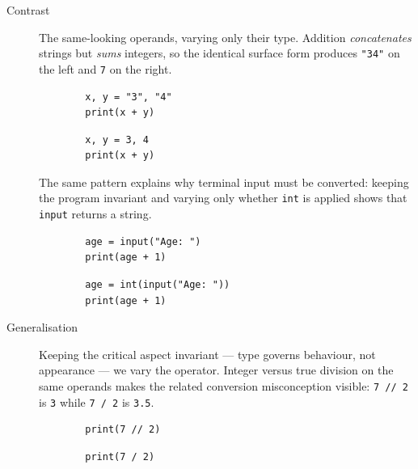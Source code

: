 \begin{description}
  \item[Contrast] The same-looking operands, varying only their type. Addition
    \emph{concatenates} strings but \emph{sums} integers, so the identical
    surface form produces \texttt{"34"} on the left and
    \texttt{7} on the right.

    \hfill
    \begin{minipage}[t]{0.45\columnwidth}
      \begin{verbatim}
        x, y = "3", "4"
        print(x + y)
      \end{verbatim}
    \end{minipage}
    \hfill
    \begin{minipage}[t]{0.45\columnwidth}
      \begin{verbatim}
        x, y = 3, 4
        print(x + y)
      \end{verbatim}
    \end{minipage}
    \newline
    The same pattern explains why terminal input must be converted: keeping the
    program invariant and varying only whether \texttt{int} is
    applied shows that \texttt{input} returns a string.

    \hfill
    \begin{minipage}[t]{0.45\columnwidth}
      \begin{verbatim}
        age = input("Age: ")
        print(age + 1)
      \end{verbatim}
    \end{minipage}
    \hfill
    \begin{minipage}[t]{0.45\columnwidth}
      \begin{verbatim}
        age = int(input("Age: "))
        print(age + 1)
      \end{verbatim}
    \end{minipage}

  \item[Generalisation] Keeping the critical aspect invariant --- type governs
    behaviour, not appearance --- we vary the operator. Integer versus
    true division on the same operands makes the related conversion
    misconception visible: \texttt{7 // 2} is
    \texttt{3} while \texttt{7 / 2} is
    \texttt{3.5}.

    \hfill
    \begin{minipage}[t]{0.45\columnwidth}
      \begin{verbatim}
        print(7 // 2)
      \end{verbatim}
    \end{minipage}
    \hfill
    \begin{minipage}[t]{0.45\columnwidth}
      \begin{verbatim}
        print(7 / 2)
      \end{verbatim}
    \end{minipage}
\end{description}


